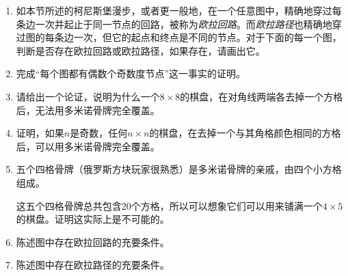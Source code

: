 \begin{enumerate}

    \item 如本节所述的柯尼斯堡漫步，或者更一般地，在一个任意图中，精确地穿过每条边一次并起止于同一节点的回路，被称为\emph{欧拉回路}。而\emph{欧拉路径}也精确地穿过图的每条边一次，但它的起点和终点是不同的节点。对于下面的每一个图，判断是否存在欧拉回路或欧拉路径，如果存在，请画出它。
    
    \begin{center}
    
    \end{center}
    
    \begin{center}
    
    \end{center}
    
    \item 完成“每个图都有偶数个奇数度节点”这一事实的证明。
    
    \wbvfill
    
    \item 请给出一个论证，说明为什么一个$8 \times 8$的棋盘，在对角线两端各去掉一个方格后，无法用多米诺骨牌完全覆盖。
    
    \wbvfill
    
    \workbookpagebreak
    
    \item 证明，如果$n$是奇数，任何$n \times n$的棋盘，在去掉一个与其角格颜色相同的方格后，可以用多米诺骨牌完全覆盖。
    \wbvfill
    
    \item 五个四格骨牌（俄罗斯方块玩家很熟悉）是多米诺骨牌的亲戚，由四个小方格组成。
    \begin{center}
    
    \end{center}
    
    \noindent 这五个四格骨牌总共包含20个方格，所以可以想象它们可以用来铺满一个$4 \times 5$的棋盘。证明这实际上是不可能的。
    
    \wbvfill
    
    \workbookpagebreak
    
    \item 陈述图中存在欧拉回路的充要条件。
    \wbvfill
    
    \item  陈述图中存在欧拉路径的充要条件。
    \wbvfill
    
    \newpage
    

\end{enumerate}
